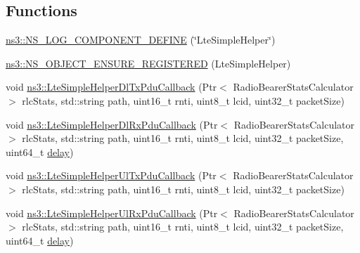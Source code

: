 \subsection*{Functions}
\begin{DoxyCompactItemize}
\item 
\hyperlink{namespacens3_a1073bbdacda76cae5dc3a4aa95935d17}{ns3\+::\+N\+S\+\_\+\+L\+O\+G\+\_\+\+C\+O\+M\+P\+O\+N\+E\+N\+T\+\_\+\+D\+E\+F\+I\+NE} (\char`\"{}Lte\+Simple\+Helper\char`\"{})
\item 
\hyperlink{namespacens3_a3d3c11d996e07b14e6a565b39473d879}{ns3\+::\+N\+S\+\_\+\+O\+B\+J\+E\+C\+T\+\_\+\+E\+N\+S\+U\+R\+E\+\_\+\+R\+E\+G\+I\+S\+T\+E\+R\+ED} (Lte\+Simple\+Helper)
\item 
void \hyperlink{namespacens3_a63f44b29a29693de95f92ea6d014ba27}{ns3\+::\+Lte\+Simple\+Helper\+Dl\+Tx\+Pdu\+Callback} (Ptr$<$ Radio\+Bearer\+Stats\+Calculator $>$ rlc\+Stats, std\+::string path, uint16\+\_\+t rnti, uint8\+\_\+t lcid, uint32\+\_\+t packet\+Size)
\item 
void \hyperlink{namespacens3_ad070d13ca11dd00b53d7ff8f2c553be1}{ns3\+::\+Lte\+Simple\+Helper\+Dl\+Rx\+Pdu\+Callback} (Ptr$<$ Radio\+Bearer\+Stats\+Calculator $>$ rlc\+Stats, std\+::string path, uint16\+\_\+t rnti, uint8\+\_\+t lcid, uint32\+\_\+t packet\+Size, uint64\+\_\+t \hyperlink{mmwave_2model_2fading-traces_2fading__trace__generator_8m_a7964e6aa8f61a9d28973c8267a606ad8}{delay})
\item 
void \hyperlink{namespacens3_aee9f5bb1a2c2f0b92329eaf60dae1356}{ns3\+::\+Lte\+Simple\+Helper\+Ul\+Tx\+Pdu\+Callback} (Ptr$<$ Radio\+Bearer\+Stats\+Calculator $>$ rlc\+Stats, std\+::string path, uint16\+\_\+t rnti, uint8\+\_\+t lcid, uint32\+\_\+t packet\+Size)
\item 
void \hyperlink{namespacens3_a7e3aa4bba736afd213bea432636a61a8}{ns3\+::\+Lte\+Simple\+Helper\+Ul\+Rx\+Pdu\+Callback} (Ptr$<$ Radio\+Bearer\+Stats\+Calculator $>$ rlc\+Stats, std\+::string path, uint16\+\_\+t rnti, uint8\+\_\+t lcid, uint32\+\_\+t packet\+Size, uint64\+\_\+t \hyperlink{mmwave_2model_2fading-traces_2fading__trace__generator_8m_a7964e6aa8f61a9d28973c8267a606ad8}{delay})
\end{DoxyCompactItemize}
